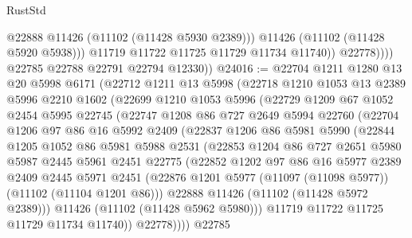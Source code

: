 \begin{lexlean}{RustStd}
\begin{coremodule}
                        @22888
                        @11426
                        (@11102 (@11428 @5930 @2389)))
                      @11426
                      (@11102 (@11428 @5920 @5938)))
                    @11719
                    @11722
                    @11725
                    @11729
                    @11734
                    @11740))
                @22778))))
        @22785
        @22788
        @22791
        @22794
        @12330))
@24016 := @22704
    @1211
    @1280
    @13
    @20
    @5998
    @6171
    (@22712
      @1211
      @13
      @5998
      (@22718
        @1210
        @1053
        @13
        @2389
        @5996
        @2210
        @1602
        (@22699
          @1210
          @1053
          @5996
          (@22729
            @1209
            @67
            @1052
            @2454
            @5995
            @22745
            (@22747
              @1208
              @86
              @727
              @2649
              @5994
              @22760
              (@22704
                @1206
                @97
                @86
                @16
                @5992
                @2409
                (@22837
                  @1206
                  @86
                  @5981
                  @5990
                  (@22844
                    @1205
                    @1052
                    @86
                    @5981
                    @5988
                    @2531
                    (@22853
                      @1204
                      @86
                      @727
                      @2651
                      @5980
                      @5987
                      @2445
                      @5961
                      @2451
                      @22775
                      (@22852
                        @1202
                        @97
                        @86
                        @16
                        @5977
                        @2389
                        @2409
                        @2445
                        @5971
                        @2451
                        (@22876 @1201 @5977 (@11097 (@11098 @5977)) (@11102 (@11104 @1201 @86)))
                        @22888
                        @11426
                        (@11102 (@11428 @5972 @2389)))
                      @11426
                      (@11102 (@11428 @5962 @5980)))
                    @11719
                    @11722
                    @11725
                    @11729
                    @11734
                    @11740))
                @22778))))
        @22785

\end{coremodule}
\end{lexlean}
